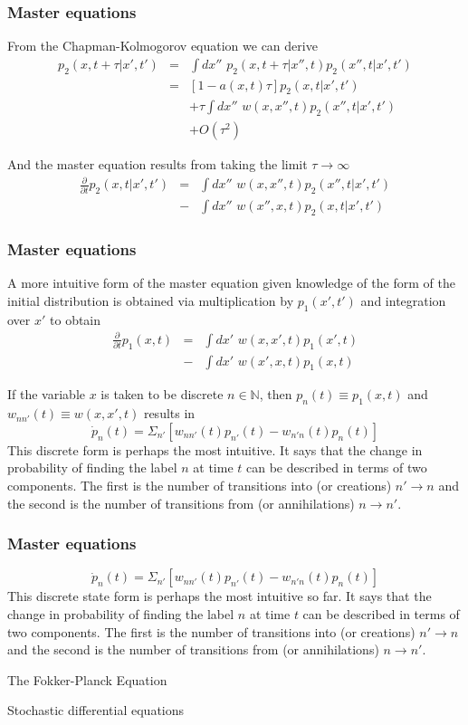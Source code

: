 \begin{frame}
\frametitle{Master equations}
From the Chapman-Kolmogorov equation we can derive
\begin{eqnarray*}
p_2(x,t+\tau|x',t') &=& \int dx'' \,\, p_2(x,t+\tau|x'',t)p_2(x'',t|x',t')\\
&=& [1-a(x,t)\tau]p_2(x,t|x',t')\\
& & +\tau \int dx'' \,\, w(x,x'',t)p_2(x'',t|x',t')\\
& & +O(\tau^2)
\end{eqnarray*}

And the master equation results from taking the limit $\tau \rightarrow \infty$
\begin{eqnarray*}
\frac{\partial}{\partial t}p_2(x,t|x',t') &=& \int dx'' \,\, w(x,x'',t)p_2(x'',t|x',t')\\
&-& \int dx'' \,\, w(x'',x,t)p_2(x,t|x',t')
\end{eqnarray*}
\end{frame}

\begin{frame}
\frametitle{Master equations}
A more intuitive form of the master equation given knowledge of the form of the initial distribution is obtained via multiplication by $p_1(x',t')$ and integration over $x'$ to obtain
\begin{eqnarray*}
\frac{\partial}{\partial t}p_1(x,t) &=& \int dx' \,\, w(x,x',t)p_1(x',t)\\
&-& \int dx' \,\, w(x',x,t)p_1(x,t)
\end{eqnarray*}

If the variable $x$ is taken to be discrete $n \in \mathbb{N}$, then $p_n(t) \equiv p_1(x,t)$ and $w_{nn'}(t) \equiv w(x,x',t)$ results in
$$
\dot{p}_n (t) = \Sigma_{n'} [w_{nn'}(t)p_{n'}(t) - w_{n'n}(t)p_{n}(t)]
$$
This discrete form is perhaps the most intuitive. It says that the change in probability of finding the label $n$ at time $t$ can be described in terms of two components. The first is the number of transitions into (or creations) $n' \rightarrow n$ and the second is the number of transitions from (or annihilations) $n \rightarrow n'$.
\end{frame}

\begin{frame}
\frametitle{Master equations}
$$
\dot{p}_n (t) = \Sigma_{n'} [w_{nn'}(t)p_{n'}(t) - w_{n'n}(t)p_{n}(t)]
$$
This discrete state form is perhaps the most intuitive so far. It says that the change in probability of finding the label $n$ at time $t$ can be described in terms of two components. The first is the number of transitions into (or creations) $n' \rightarrow n$ and the second is the number of transitions from (or annihilations) $n \rightarrow n'$.
\end{frame}

\begin{frame}
The Fokker-Planck Equation

\end{frame}

\begin{frame}
Stochastic differential equations

\end{frame}